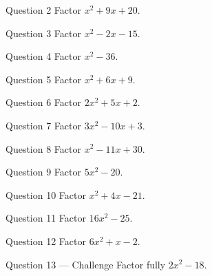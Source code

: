 \documentclass[11pt]{article}
\begin{document}
\begin{qbox}{Question 2}
Factor $x^2+9x+20$.\workspace{2.4cm}
\end{qbox}

\begin{qbox}{Question 3}
Factor $x^2-2x-15$.\workspace{2.4cm}
\end{qbox}

\begin{qbox}{Question 4}
Factor $x^2-36$.\workspace{2.4cm}
\end{qbox}

\begin{qbox}{Question 5}
Factor $x^2+6x+9$.\workspace{2.4cm}
\end{qbox}

\begin{qbox}{Question 6}
Factor $2x^2+5x+2$.\workspace{2.4cm}
\end{qbox}

\begin{qbox}{Question 7}
Factor $3x^2-10x+3$.\workspace{2.4cm}
\end{qbox}

\begin{qbox}{Question 8}
Factor $x^2-11x+30$.\workspace{2.4cm}
\end{qbox}

\begin{qbox}{Question 9}
Factor $5x^2-20$.\workspace{2.4cm}
\end{qbox}

\begin{qbox}{Question 10}
Factor $x^2+4x-21$.\workspace{2.4cm}
\end{qbox}

\begin{qbox}{Question 11}
Factor $16x^2-25$.\workspace{2.4cm}
\end{qbox}

\begin{qbox}{Question 12}
Factor $6x^2+x-2$.\workspace{2.4cm}
\end{qbox}

\begin{qbox}{Question 13 --- Challenge}
Factor fully $2x^2-18$.\workspace{3cm}
\end{qbox}

\clearpage
{}
\end{document}
